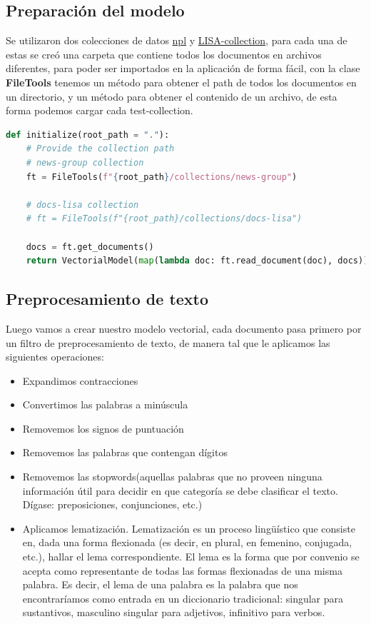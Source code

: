 \documentclass{llncs}
\begin{document}
\subsection{Preparación del modelo}

Se utilizaron dos colecciones de datos \href{http://ir.dcs.gla.ac.uk/resources/test_collections/npl/}{npl} y \href{http://ir.dcs.gla.ac.uk/resources/test_collections/lisa/}{LISA-collection}, para cada una de estas se creó una carpeta que contiene todos los documentos en archivos diferentes, para poder ser importados en la aplicación de forma fácil, con la clase \textbf{FileTools} tenemos un método para obtener el path de todos los documentos en un directorio, y un método para obtener el contenido de un archivo, de esta forma podemos cargar cada test-collection.

\begin{lstlisting}[language=Python]
def initialize(root_path = "."):
    # Provide the collection path
    # news-group collection
    ft = FileTools(f"{root_path}/collections/news-group")

    # docs-lisa collection
    # ft = FileTools(f"{root_path}/collections/docs-lisa")

    docs = ft.get_documents()
    return VectorialModel(map(lambda doc: ft.read_document(doc), docs))
\end{lstlisting}

\subsection{Preprocesamiento de texto}

Luego vamos a crear nuestro modelo vectorial, cada documento pasa primero por un filtro de preprocesamiento de texto, de manera tal que le aplicamos las siguientes operaciones:

\begin{itemize}
	\item Expandimos contracciones
	\item Convertimos las palabras a minúscula
	\item Removemos los signos de puntuación
	\item Removemos las palabras que contengan dígitos
	\item Removemos las stopwords(aquellas palabras que no proveen ninguna información útil para decidir en que categoría se debe clasificar el texto. Dígase: preposiciones, conjunciones, etc.)
	\item Aplicamos lematización. Lematización es un proceso lingüístico que consiste en, dada una forma flexionada (es decir, en plural, en femenino, conjugada, etc.), hallar el lema correspondiente. El lema es la forma que por convenio se acepta como representante de todas las formas flexionadas de una misma palabra. Es decir, el lema de una palabra es la palabra que nos encontraríamos como entrada en un diccionario tradicional: singular para sustantivos, masculino singular para adjetivos, infinitivo para verbos.
\end{itemize}
\end{document}
